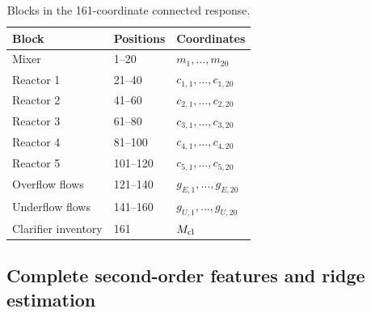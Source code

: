 \begin{table}[htbp]
\centering\small
\caption{Blocks in the 161-coordinate connected response.}
\label{tab:plant_response_positions}
\begin{tabular}{lll}
\toprule Block & Positions & Coordinates\\\midrule
Mixer & 1--20 & $m_1,\ldots,m_{20}$\\
Reactor 1 & 21--40 & $c_{1,1},\ldots,c_{1,20}$\\
Reactor 2 & 41--60 & $c_{2,1},\ldots,c_{2,20}$\\
Reactor 3 & 61--80 & $c_{3,1},\ldots,c_{3,20}$\\
Reactor 4 & 81--100 & $c_{4,1},\ldots,c_{4,20}$\\
Reactor 5 & 101--120 & $c_{5,1},\ldots,c_{5,20}$\\
Overflow flows & 121--140 & $g_{E,1},\ldots,g_{E,20}$\\
Underflow flows & 141--160 & $g_{U,1},\ldots,g_{U,20}$\\
Clarifier inventory & 161 & $M_{\rm cl}$\\
\bottomrule
\end{tabular}
\end{table}

\subsection{Complete second-order features and ridge estimation}

